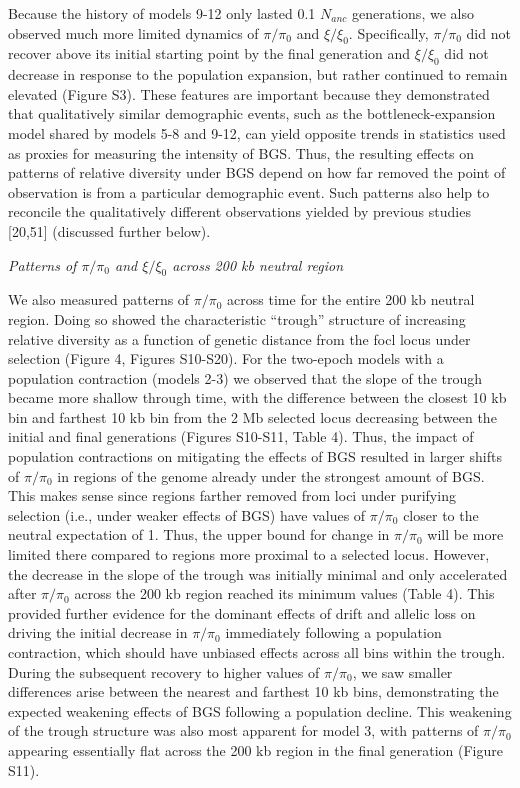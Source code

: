 \documentclass[9pt,twocolumn,twoside]{rilabRxiv}
\begin{document}
Because the history of models 9-12 only lasted 0.1
$N_{anc}$ generations, we also observed much more
limited dynamics of $\pi/\pi_0$ and $\xi/\xi_0$.
Specifically, $\pi/\pi_0$ did not recover above its initial
starting point by the final generation and $\xi/\xi_0$ did not
decrease in response to the population expansion, but rather continued
to remain elevated (Figure S3). These features are important because
they demonstrated that qualitatively similar demographic events, such as
the bottleneck-expansion model shared by models 5-8 and 9-12, can yield
opposite trends in statistics used as proxies for measuring the
intensity of BGS. Thus, the resulting effects on patterns of relative
diversity under BGS depend on how far removed the point of observation
is from a particular demographic event. Such patterns also help to
reconcile the qualitatively different observations yielded by previous
studies [20,51] (discussed further below).

\emph{Patterns of $\pi/\pi_0$ and $\xi/\xi_0$ across
200 kb neutral region}

We also measured patterns of $\pi/\pi_0$ across time for the
entire 200 kb neutral region. Doing so showed the characteristic
``trough'' structure of increasing relative diversity as a function of
genetic distance from the focl locus under selection (Figure 4, Figures
S10-S20). For the two-epoch models with a population contraction (models
2-3) we observed that the slope of the trough became more shallow
through time, with the difference between the closest 10 kb bin and
farthest 10 kb bin from the 2 Mb selected locus decreasing between the
initial and final generations (Figures S10-S11, Table 4). Thus, the
impact of population contractions on mitigating the effects of BGS
resulted in larger shifts of $\pi/\pi_0$ in regions of the
genome already under the strongest amount of BGS. This makes sense since
regions farther removed from loci under purifying selection (i.e., under
weaker effects of BGS) have values of $\pi/\pi_0$ closer to the
neutral expectation of 1. Thus, the upper bound for change in
$\pi/\pi_0$ will be more limited there compared to regions more
proximal to a selected locus. However, the decrease in the slope of the
trough was initially minimal and only accelerated after
$\pi/\pi_0$ across the 200 kb region reached its minimum values
(Table 4). This provided further evidence for the dominant effects of
drift and allelic loss on driving the initial decrease in
$\pi/\pi_0$ immediately following a population contraction,
which should have unbiased effects across all bins within the trough.
During the subsequent recovery to higher values of $\pi/\pi_0$, we saw smaller differences arise
between the nearest and farthest 10 kb bins, demonstrating the expected
weakening effects of BGS following a population decline. This weakening
of the trough structure was also most apparent for model 3, with
patterns of $\pi/\pi_0$ appearing essentially flat across the
200 kb region in the final generation (Figure S11).
\end{document}
